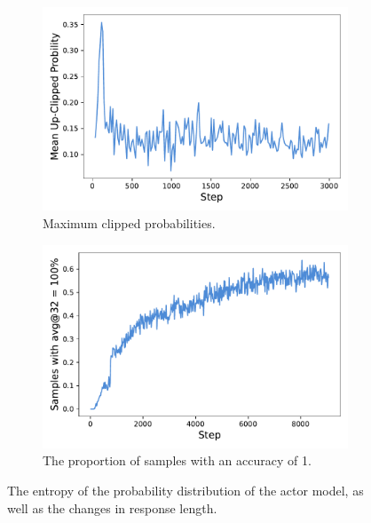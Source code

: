 
\begin{figure}
    \centering
    \begin{subfigure}{0.49\textwidth}
        \centering
        \includegraphics[width=\textwidth]{figures/3.1.3.pdf}
        \caption{Maximum clipped probabilities.}
        \label{fig:max_prob_clipped}
    \end{subfigure}
    \hfill
    \begin{subfigure}{0.49\textwidth}
        \centering
        \includegraphics[width=\textwidth]{figures/3.2.1.pdf}
    \caption{The proportion of samples with an accuracy of 1.}
    \label{fig:num_samples_eq_1}
    \end{subfigure}
    
    \caption{The entropy of the probability distribution of the actor model, as well as the changes in response length.}
    \label{fig:3212}
\end{figure}

